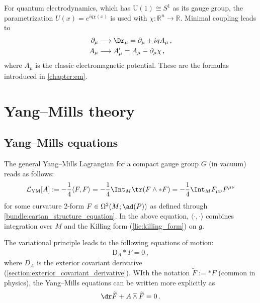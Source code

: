     \begin{example}[QED]
        For quantum electrodynamics, which has $\mathrm{U}(1)\cong S^1$ as its gauge group, the parametrization $U(x)=e^{iq\chi(x)}$ is used with $\chi:\mathbb{R}^n\rightarrow\mathbb{R}$. Minimal coupling leads to
        \begin{align}
            \partial_\mu &\longrightarrow\Dr_\mu = \partial_\mu + iqA_\mu\,,\\
            A_\mu &\longrightarrow A_\mu' = A_\mu - \partial_\mu\chi\,,
        \end{align}
        where $A_\mu$ is the classic electromagnetic potential. These are the formulas introduced in \cref{chapter:em}.
    \end{example}

\section{Yang--Mills theory}
\subsection{Yang--Mills equations}

    The general Yang--Mills Lagrangian for a compact gauge group $G$ (in vacuum) reads as follows:
    \begin{gather}
        \label{gauge:YM_lagrangian}
        \mathcal{L}_{\text{YM}}[A] := -\frac{1}{4}\langle F,F\rangle = -\frac{1}{4}\Int_M\tr(F\wedge\ast F) = -\frac{1}{4}\Int_MF_{\mu\nu}F^{\mu\nu}
    \end{gather}
    for some curvature 2-form $F\in\Omega^2(M;\ad(P))$ as defined through \cref{bundle:cartan_structure_equation}. In the above equation, $\langle\cdot,\cdot\rangle$ combines integration over $M$ and the Killing form (\cref{lie:killing_form}) on $\mathfrak{g}$.

    The variational principle leads to the following equations of motion:
    \begin{gather}
        \label{gauge:YM_equation}
        \mathrm{D}_A\ast F = 0\,,
    \end{gather}
    where $D_A$ is the exterior covariant derivative (\cref{section:exterior_covariant_derivative}). WIth the notation $\widetilde{F}:=\ast F$ (common in physics), the Yang--Mills equations can be written more explicitly as
    \begin{gather}
        \dr\widetilde{F} + A\barwedge\widetilde{F} = 0\,.
    \end{gather}

